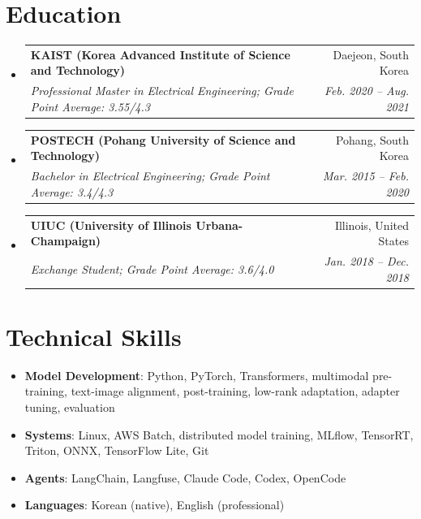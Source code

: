 \documentclass[letterpaper,11pt]{article}
\makeatletter
\newcommand{\resumeSubheading}[4]{
  \vspace{-1pt}\item
    \begin{tabular*}{0.97\textwidth}{l@{\extracolsep{\fill}}r}
      \textbf{#1} & #2 \\
      \textit{\small#3} & \textit{\small #4} \\
    \end{tabular*}\vspace{-5pt}
}
\newcommand{\resumeSubHeadingListStart}{\begin{itemize}[leftmargin=*]}
\newcommand{\resumeSubHeadingListEnd}{\end{itemize}}
\makeatother
\begin{document}
\section{Education}
  \resumeSubHeadingListStart
    \resumeSubheading
      {KAIST (Korea Advanced Institute of Science and Technology)}{Daejeon, South Korea}
      {Professional Master in Electrical Engineering; Grade Point Average: 3.55/4.3}{Feb. 2020 -- Aug. 2021}
    \resumeSubheading
      {POSTECH (Pohang University of Science and Technology)}{Pohang, South Korea}
      {Bachelor in Electrical Engineering; Grade Point Average: 3.4/4.3}{Mar. 2015 -- Feb. 2020}
    \resumeSubheading
      {UIUC (University of Illinois Urbana-Champaign)}{Illinois, United States}
      {Exchange Student; Grade Point Average: 3.6/4.0}{Jan. 2018 -- Dec. 2018}
  \resumeSubHeadingListEnd

\section{Technical Skills}
 \resumeSubHeadingListStart
   \item{
     \textbf{Model Development}{: Python, PyTorch, Transformers, multimodal pre-training, text-image alignment, post-training, low-rank adaptation, adapter tuning, evaluation}
   }
   \item{
     \textbf{Systems}{: Linux, AWS Batch, distributed model training, MLflow, TensorRT, Triton, ONNX, TensorFlow Lite, Git}
   }
   \item{
     \textbf{Agents}{: LangChain, Langfuse, Claude Code, Codex, OpenCode}
   }
   \item{
     \textbf{Languages}{: Korean (native), English (professional)}
   }
 \resumeSubHeadingListEnd
\end{document}
